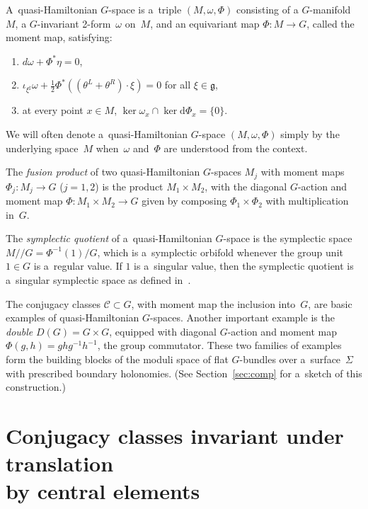 \begin{Definition}
\label{def:quasi}
A~quasi-Hamiltonian $G$-space is a~triple $(M,\omega,\Phi)$ consisting of a $G$-manifold $M$,
a $G$-invariant 2-form~$\omega$ on~$M$, and an equivariant map $\Phi\colon M \to G$, called the moment map, satisfying:
\begin{enumerate}\itemsep=0pt
\item[i)] $d\omega + \Phi^* \eta = 0 $,
\item[ii)] $\iota_{\xi^\sharp}\omega +\tfrac{1}{2} \Phi^*((\theta^L + \theta^R) \cdot \xi)=0$ for all $\xi \in \mathfrak{g}$,
\item[iii)] at every point $x\in M$, $\ker \omega_x \cap \ker \mathrm{d} \Phi_x = \{0\}$.
\end{enumerate}
\end{Definition}

We will often denote a~quasi-Hamiltonian $G$-space $(M,\omega,\Phi)$ simply by the underlying space~$M$ when~$\omega$
and~$\Phi$ are understood from the context.

The \emph{fusion product} of two quasi-Hamiltonian $G$-spaces $M_j$ with moment maps $\Phi_j:M_j \to G$ ($j=1,2$) is the
product $M_1\times M_2$, with the diagonal $G$-action and moment map $\Phi:M_1 \times M_2 \to G$ given by composing
$\Phi_1 \times \Phi_2$ with multiplication in~$G$.

The \emph{symplectic quotient} of a~quasi-Hamiltonian $G$-space is the symplectic space $M/ /G = \Phi^{-1}(1)/G$, which
is a~symplectic orbifold whenever the group unit $1 \in G$ is a~regular value.
If $1$ is a~singular value, then the symplectic quotient is a~singular symplectic space as def\/ined in~\cite{MS}.

The conjugacy classes $\mathcal{C}\subset G$, with moment map the inclusion into~$G$, are basic examples of
quasi-Hamiltonian $G$-spaces.
Another important example is the \emph{double} $D(G)=G\times G$, equipped with diagonal $G$-action and moment map
$\Phi(g,h)=ghg^{-1}h^{-1}$, the group commutator.
These two families of examples form the building blocks of the moduli space of f\/lat $G$-bundles over a~surface~$\Sigma$
with prescribed boundary holonomies.
(See Section~\ref{sec:comp} for a~sketch of this construction.)

\section{Conjugacy classes invariant under translation \\
by central elements}

